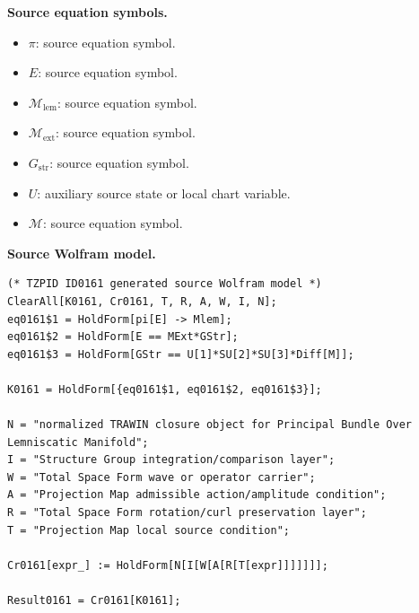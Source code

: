 \begin{minipage}[t]{0.49\linewidth}
\begingroup
\small
\raggedright
\textbf{Source equation symbols.}\par
\begin{itemize}[leftmargin=1.35em,itemsep=1pt,topsep=1pt,parsep=0pt]
    \item $\pi$: source equation symbol.
    \item $E$: source equation symbol.
    \item $\mathcal{M}_{\mathrm{lem}}$: source equation symbol.
    \item $\mathcal{M}_{\mathrm{ext}}$: source equation symbol.
    \item $G_{\mathrm{str}}$: source equation symbol.
    \item $U$: auxiliary source state or local chart variable.
    \item $\mathcal{M}$: source equation symbol.
\end{itemize}
\endgroup
\end{minipage}\hfill
\begin{minipage}[t]{0.47\linewidth}
\begingroup
\scriptsize
\raggedright
\textbf{Source Wolfram model.}\par
\begin{Verbatim}[fontsize=\tiny,breaklines=true,breakanywhere=true]
(* TZPID ID0161 generated source Wolfram model *)
ClearAll[K0161, Cr0161, T, R, A, W, I, N];
eq0161$1 = HoldForm[pi[E] -> Mlem];
eq0161$2 = HoldForm[E == MExt*GStr];
eq0161$3 = HoldForm[GStr == U[1]*SU[2]*SU[3]*Diff[M]];

K0161 = HoldForm[{eq0161$1, eq0161$2, eq0161$3}];

N = "normalized TRAWIN closure object for Principal Bundle Over Lemniscatic Manifold";
I = "Structure Group integration/comparison layer";
W = "Total Space Form wave or operator carrier";
A = "Projection Map admissible action/amplitude condition";
R = "Total Space Form rotation/curl preservation layer";
T = "Projection Map local source condition";

Cr0161[expr_] := HoldForm[N[I[W[A[R[T[expr]]]]]]];

Result0161 = Cr0161[K0161];
\end{Verbatim}
\endgroup
\end{minipage}

